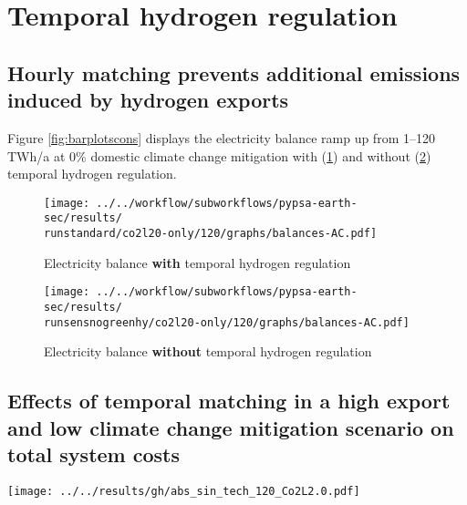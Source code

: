 \section{Temporal hydrogen regulation}
\label{subsec:gh_constraint_effects}

\subsection{Hourly matching prevents additional emissions induced by hydrogen exports}
Figure \ref{fig:barplotscons} displays the electricity balance ramp up from 1--120 TWh/a at 0\% domestic climate change mitigation with (\ref{fig:balances_AC_monthlymatch}) and without (\ref{fig:balances_AC_nogreen}) temporal hydrogen regulation.

\begin{figure*}[h!]
    \centering
    \begin{subfigure}[b]{0.49\linewidth}
        \centering
        \texttt{[image: ../../workflow/subworkflows/pypsa-earth-sec/results/\\runstandard/co2l20-only/120/graphs/balances-AC.pdf]}
        \caption{Electricity balance {\bf with} temporal hydrogen regulation}
        \label{fig:balances_AC_monthlymatch}
    \end{subfigure}
    \hfill
    \begin{subfigure}[b]{0.49\linewidth}
        \centering
        \texttt{[image: ../../workflow/subworkflows/pypsa-earth-sec/results/\\runsensnogreenhy/co2l20-only/120/graphs/balances-AC.pdf]}
        \caption{Electricity balance {\bf without} temporal hydrogen regulation}
        \label{fig:balances_AC_nogreen}
    \end{subfigure}
    \hfill
    \caption{Electricity balance ramp up from 1--120 TWh/a at 0\% domestic climate change mitigation with (\ref{fig:balances_AC_monthlymatch}) and without (\ref{fig:balances_AC_nogreen}) temporal hydrogen regulation}
    \label{fig:barplotscons}
\end{figure*}


\subsection{Effects of temporal matching in a high export and low climate change mitigation scenario on total system costs}

\begin{figure*}[h]
    \centering
    \texttt{[image: ../../results/gh/abs\_sin\_tech\_120\_Co2L2.0.pdf]}
    \caption{Total system costs at 120 TWh/a export and 0\% domestic climate change mitigation. Stricter temporal hydrogen regulation mainly increases the total CAPEX of additional solar PV, electrolysis and hydrogen storage. In return, the OPEX of fossil generation (mainly gas), decreases. The large share of oil OPEX is independent of temporal hydrogen regulation, since these costs are mainly linked to combustion engine cars with demands independent of temporal hydrogen regulation.}
    \label{fig:tsc-120-0}
\end{figure*}


\clearpage
